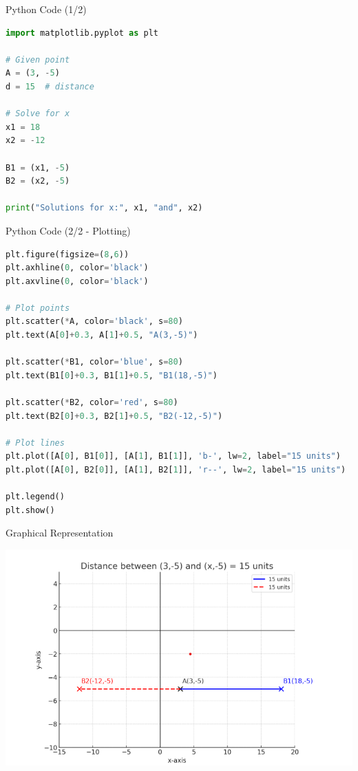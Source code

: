\documentclass{beamer}
\begin{document}
\begin{frame}[fragile]{Python Code (1/2)}
\begin{lstlisting}[language=Python]
import matplotlib.pyplot as plt

# Given point
A = (3, -5)
d = 15  # distance

# Solve for x
x1 = 18
x2 = -12

B1 = (x1, -5)
B2 = (x2, -5)

print("Solutions for x:", x1, "and", x2)
\end{lstlisting}
\end{frame}

\begin{frame}[fragile]{Python Code (2/2 - Plotting)}
\begin{lstlisting}[language=Python]
plt.figure(figsize=(8,6))
plt.axhline(0, color='black')
plt.axvline(0, color='black')

# Plot points
plt.scatter(*A, color='black', s=80)
plt.text(A[0]+0.3, A[1]+0.5, "A(3,-5)")

plt.scatter(*B1, color='blue', s=80)
plt.text(B1[0]+0.3, B1[1]+0.5, "B1(18,-5)")

plt.scatter(*B2, color='red', s=80)
plt.text(B2[0]+0.3, B2[1]+0.5, "B2(-12,-5)")

# Plot lines
plt.plot([A[0], B1[0]], [A[1], B1[1]], 'b-', lw=2, label="15 units")
plt.plot([A[0], B2[0]], [A[1], B2[1]], 'r--', lw=2, label="15 units")

plt.legend()
plt.show()
\end{lstlisting}
\end{frame}

\begin{frame}{Graphical Representation}
\begin{center}
 \includegraphics[width=0.6\columnwidth]{figs/plot2.png}
\end{center}
\end{frame}
\end{document}
